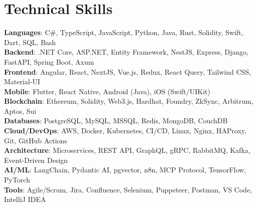 \section{Technical Skills}
 \begin{itemize}[leftmargin=0.15in, label={}]
    \small{\item{
     \textbf{Languages}{: C\#, TypeScript, JavaScript, Python, Java, Rust, Solidity, Swift, Dart, SQL, Bash} \\
     \textbf{Backend}{: .NET Core, ASP.NET, Entity Framework, NestJS, Express, Django, FastAPI, Spring Boot, Axum} \\
     \textbf{Frontend}{: Angular, React, NextJS, Vue.js, Redux, React Query, Tailwind CSS, Material-UI} \\
     \textbf{Mobile}{: Flutter, React Native, Android (Java), iOS (Swift/UIKit)} \\
     \textbf{Blockchain}{: Ethereum, Solidity, Web3.js, Hardhat, Foundry, ZkSync, Arbitrum, Aptos, Sui} \\
     \textbf{Databases}{: PostgreSQL, MySQL, MSSQL, Redis, MongoDB, CouchDB} \\
     \textbf{Cloud/DevOps}{: AWS, Docker, Kubernetes, CI/CD, Linux, Nginx, HAProxy, Git, GitHub Actions} \\
     \textbf{Architecture}{: Microservices, REST API, GraphQL, gRPC, RabbitMQ, Kafka, Event-Driven Design} \\
     \textbf{AI/ML}{: LangChain, Pydantic AI, pgvector, n8n, MCP Protocol, TensorFlow, PyTorch} \\
     \textbf{Tools}{: Agile/Scrum, Jira, Confluence, Selenium, Puppeteer, Postman, VS Code, IntelliJ IDEA}
    }}
 \end{itemize}